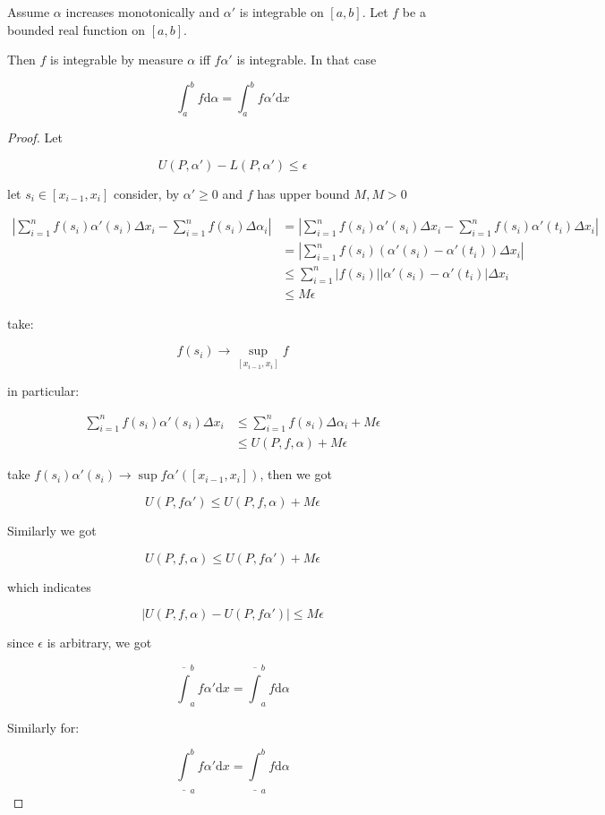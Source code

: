\begin{thm}
    Assume $\alpha$ increases monotonically and $\alpha'$ is integrable on $[a,b]$. 
    Let $f$ be a bounded real function on $[a,b]$.

    Then $f$ is integrable by measure $\alpha$ iff $f\alpha'$ is integrable. In that case

    \[
        \int_a^b f \mathrm{d} \alpha  = \int_a^b f \alpha' \mathrm{d}x
    \]
\end{thm}

\begin{proof}
    Let

    \[
        U(P,\alpha') -L(P, \alpha') \le \epsilon
    \]

    let $s_i \in [x_{i-1},x_i]$ consider, by $\alpha' \ge 0$ and $f$ has upper bound $M, M > 0$

    \begin{align*}
        \left| \sum_{i=1}^{n} f(s_i) \alpha'(s_i) \Delta x_i - \sum_{i=1}^{n} f(s_i) \Delta \alpha_i \right| &= \left| \sum_{i=1}^{n} f(s_i) \alpha'(s_i) \Delta x_i - \sum_{i=1}^{n} f(s_i) \alpha'(t_i)\Delta x_i \right| \\
        & = \left| \sum_{i=1}^{n} f(s_i)\left( \alpha'(s_i) - \alpha'(t_i) \right) \Delta x_i \right| \\
        & \le \sum_{i=1}^{n} \left| f(s_i) \right| \left| \alpha'(s_i) - \alpha'(t_i) \right| \Delta x_i  \\
        & \le M \epsilon
    \end{align*}

    take:

    \[
        f(s_i) \to \sup_{[x_{i-1},x_i]} f
    \]

    in particular:

    \begin{align*}
    \sum_{i=1}^{n} f(s_i) \alpha'(s_i) \Delta x_i &\le  \sum_{i=1}^{n} f(s_i) \Delta \alpha_i + M\epsilon \\
    & \le U(P,f,\alpha) + M\epsilon
    \end{align*}

    take $f(s_i)\alpha'(s_i) \to \sup f\alpha'([x_{i-1},x_i])$, then we got

    \[
        U(P,f\alpha') \le U(P,f,\alpha) + M\epsilon
    \]

    Similarly we got

    \[
        U(P,f,\alpha) \le U(P,f\alpha') + M\epsilon
    \]

    which indicates

    \[
        \left| U(P,f,\alpha) -U(P,f\alpha') \right| \le M \epsilon
    \]

    since $\epsilon$ is arbitrary, we got

    \[
        \overline{\int}_a^b f \alpha' \mathrm{d} x =\overline{\int}_a^b f  \mathrm{d} \alpha
    \]

    Similarly for:

    \[
        \underline{\int}_a^b f \alpha' \mathrm{d} x =\underline{\int}_a^b f  \mathrm{d} \alpha
    \]
\end{proof}


